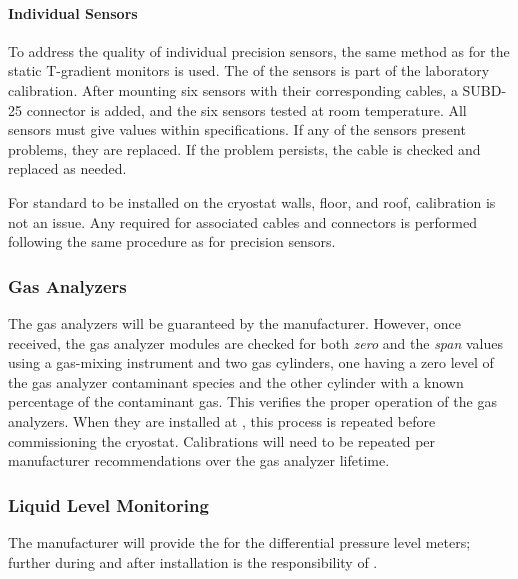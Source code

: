 \paragraph{Individual Sensors}
\label{sec:fdgen-slow-cryo-qc-is}

To address the quality of individual precision sensors, the same method as for the static T-gradient monitors %
is used.
The  of the sensors is part of the laboratory calibration. After mounting six sensors with their corresponding cables, a
SUBD-25 connector %
is added, and the six sensors tested at room temperature. All sensors %
must %
give values within specifications.  
If any of the sensors present problems, they are replaced.  If the problem persists, the cable is checked and replaced as needed.

For standard  to be installed on the cryostat walls, floor, and roof, calibration is not an issue. Any  required for associated cables and connectors %
is performed following the same procedure as for precision sensors. 

\subsubsection{Gas Analyzers}
\label{sec:fdgen-slow-cryo-qc-ga}


The gas analyzers will be guaranteed by the manufacturer. However, once received, the gas analyzer modules %
are checked for both \textit{zero} and the \textit{span} values using a gas-mixing instrument and two gas cylinders, one having a zero level of the gas analyzer contaminant species and the other cylinder with a known percentage of the contaminant gas. This %
 verifies the proper operation of the gas analyzers. When they are installed at , this process %
 is repeated before commissioning the cryostat. Calibrations will need to be repeated %
 per manufacturer recommendations over the gas analyzer lifetime.


\subsubsection{Liquid Level Monitoring}
\label{sec:fdgen-slow-cryo-qc-llm}

The manufacturer will provide the  for the differential pressure level meters; further  during and after installation %
is the responsibility of .

